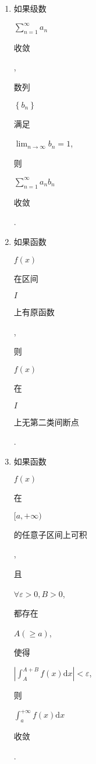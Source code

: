 \documentclass[10pt]{article}
\begin{document}
\begin{enumerate}
  \item \begin{CJK}{UTF8}{mj}如果级数\end{CJK} $\sum_{n=1}^{\infty} a_{n}$ \begin{CJK}{UTF8}{mj}收敛\end{CJK}, \begin{CJK}{UTF8}{mj}数列\end{CJK} $\left\{b_{n}\right\}$ \begin{CJK}{UTF8}{mj}满足\end{CJK} $\lim _{n \rightarrow \infty} b_{n}=1$, \begin{CJK}{UTF8}{mj}则\end{CJK} $\sum_{n=1}^{\infty} a_{n} b_{n}$ \begin{CJK}{UTF8}{mj}收敛\end{CJK}.

  \item \begin{CJK}{UTF8}{mj}如果函数\end{CJK} $f(x)$ \begin{CJK}{UTF8}{mj}在区间\end{CJK} $I$ \begin{CJK}{UTF8}{mj}上有原函数\end{CJK}, \begin{CJK}{UTF8}{mj}则\end{CJK} $f(x)$ \begin{CJK}{UTF8}{mj}在\end{CJK} $I$ \begin{CJK}{UTF8}{mj}上无第二类间断点\end{CJK}.

  \item \begin{CJK}{UTF8}{mj}如果函数\end{CJK} $f(x)$ \begin{CJK}{UTF8}{mj}在\end{CJK} $[a,+\infty)$ \begin{CJK}{UTF8}{mj}的任意子区间上可积\end{CJK}, \begin{CJK}{UTF8}{mj}且\end{CJK} $\forall \varepsilon>0, B>0$, \begin{CJK}{UTF8}{mj}都存在\end{CJK} $A(\geqslant a)$, \begin{CJK}{UTF8}{mj}使得\end{CJK} $\left|\int_{A}^{A+B} f(x) \mathrm{d} x\right|<\varepsilon$, \begin{CJK}{UTF8}{mj}则\end{CJK} $\int_{a}^{+\infty} f(x) \mathrm{d} x$ \begin{CJK}{UTF8}{mj}收敛\end{CJK}.

\end{enumerate}
\end{document}
